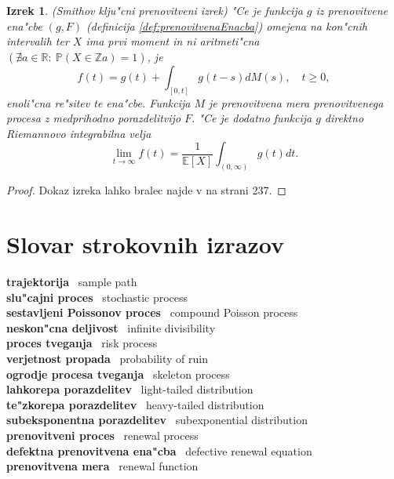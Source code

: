 \documentclass[12pt, a4paper, reqno]{amsart}
\theoremstyle{definition}
\theoremstyle{plain}
\newtheorem{izrek}[definicija]{Izrek}
\newcommand{\R}{\mathbb{R}}
\newcommand{\E}{\mathbb{E}}
\newcommand{\Prob}{\mathbb{P}}
\newcommand{\1}{\mathds{1}}
\begin{document}
    \begin{izrek}(Smithov klju"cni prenovitveni izrek)
        "Ce je funkcija $g$ iz prenovitvene ena"cbe $(g, F)$ (definicija \ref{def:prenovitvenaEnacba})
        omejena na kon"cnih intervalih ter $X$ ima prvi moment in ni aritmeti"cna 
        $(\nexists a\in\R: \ \Prob\left(X \in \mathbb{Z} a\right) = 1)$, je
        \begin{equation*}
            f(t) = g(t) +  \int_{[0, t]}g(t - s)dM(s), \quad t\geq 0,
        \end{equation*}
        enoli"cna re"sitev te ena"cbe. Funkcija $M$ je prenovitvena mera prenovitvenega procesa z medprihodno 
        porazdelitvijo $F$.
        "Ce je dodatno funkcija $g$ direktno Riemannovo integrabilna velja 
        \begin{equation*}
            \lim_{t\to\infty}f(t) = \frac{1}{\E\left[X\right]}\int_{(0, \infty)}g(t)dt.
        \end{equation*}
        \label{izr:Smith}
    \end{izrek}

    \begin{proof}
        Dokaz izreka lahko bralec najde v \cite{8} na strani 237. 
    \end{proof}


\section*{Slovar strokovnih izrazov}

\noindent
\textbf{trajektorija} \ sample path \\
\textbf{slu"cajni proces} \ stochastic process \\
\textbf{sestavljeni Poissonov proces} \ compound Poisson process \\
\textbf{neskon"cna deljivost} \ infinite divisibility \\
\textbf{proces tveganja} \ risk process \\
\textbf{verjetnost propada} \ probability of ruin \\
\textbf{ogrodje procesa tveganja} \ skeleton process \\
\textbf{lahkorepa porazdelitev} \ light-tailed distribution \\
\textbf{te"zkorepa porazdelitev} \ heavy-tailed distribution \\
\textbf{subeksponentna porazdelitev} \ subexponential distribution \\
\textbf{prenovitveni proces} \ renewal process \\
\textbf{defektna prenovitvena ena"cba} \ defective renewal equation \\
\textbf{prenovitvena mera} \ renewal function \\
\end{document}
